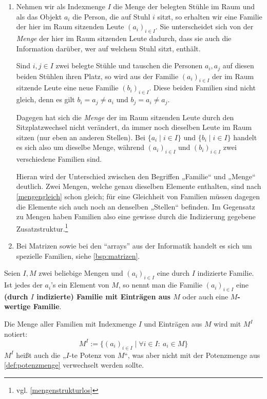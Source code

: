 \begin{bsp} \quad
    \begin{enumerate}
	\item Nehmen wir als Indexmenge $I$ die Menge der belegten Stühle im Raum und als das Objekt $a_i$ die Person, die auf Stuhl $i$ sitzt, so erhalten wir eine Familie der hier im Raum sitzenden Leute $(a_i)_{i\in I}$. Sie unterscheidet sich von der \textit{Menge} der hier im Raum sitzenden Leute dadurch, dass sie auch die Information darüber, wer auf welchem Stuhl sitzt, enthält.
	
	Sind $i,j\in I$ zwei belegte Stühle und tauschen die Personen $a_i,a_j$ auf diesen beiden Stühlen ihren Platz, so wird aus der Familie $(a_i)_{i\in I}$ der im Raum sitzende Leute eine neue Familie $(b_i)_{i\in I}$. Diese beiden Familien sind nicht gleich, denn es gilt $b_i=a_j\neq a_i$ und $b_j=a_i\neq a_j$.
	
	Dagegen hat sich die \emph{Menge} der im Raum sitzenden Leute durch den Sitzplatzwechsel nicht verändert, da immer noch dieselben Leute im Raum sitzen (nur eben an anderen Stellen). Bei $\{a_i\mid i\in I\}$ und $\{b_i \mid i\in I\}$ handelt es sich also um dieselbe Menge, während $(a_i)_{i\in I}$ und $(b_i)_{i\in I}$ zwei verschiedene Familien sind.
	
    Hieran wird der Unterschied zwischen den Begriffen „Familie“ und „Menge“ deutlich. Zwei Mengen, welche genau dieselben Elemente enthalten, sind nach \cref{mengengleich} schon gleich; für eine Gleichheit von Familien müssen dagegen die Elemente sich auch noch an denselben „Stellen“ befinden. Im Gegensatz zu Mengen haben Familien also eine gewisse durch die Indizierung gegebene Zusatzstruktur.\footnote{vgl. \cref{mengenstrukturlos}}
	\item Bei Matrizen sowie bei den ``arrays'' aus der Informatik handelt es sich um spezielle Familien, siehe \cref{bsp:matrizen}.
    \end{enumerate}
\end{bsp}


\begin{defin} \label{def:mengenpotenz}
    Seien $I,M$ zwei beliebige Mengen und $(a_i)_{i\in I}$ eine durch $I$ indizierte Familie. Ist jedes der $a_i$'s ein Element von $M$, so nennt man die Familie $(a_i)_{i\in I}$ eine \textbf{(durch $I$ indizierte) Familie mit Einträgen aus $M$} oder auch eine \textbf{$M$-wertige Familie}.
    
    Die Menge aller Familien mit Indexmenge $I$ und Einträgen aus $M$ wird mit $M^I$ notiert:
        \[ M^I := \{ (a_i)_{i\in I} \mid \forall i\in I:\ a_i \in M \} \]
    $M^I$ heißt auch die „$I$-te Potenz von $M$“, was aber nicht mit der Potenzmenge aus \cref{def:potenzmenge} verwechselt werden sollte.
\end{defin}


